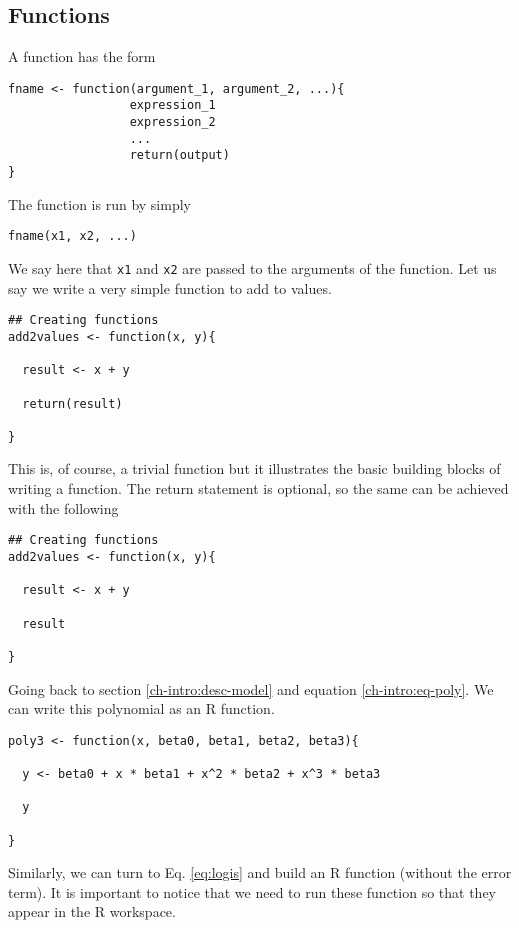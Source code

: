 \subsection{Functions}

A function has the form 

\begin{lstlisting}
fname <- function(argument_1, argument_2, ...){
                 expression_1
                 expression_2
                 ...
                 return(output)
}
\end{lstlisting}

The function is run by simply

\begin{lstlisting}
fname(x1, x2, ...)
\end{lstlisting}

We say here that \texttt{x1} and \texttt{x2} are passed to the
arguments of the function. Let us say we write a very simple function
to add to values.

\begin{lstlisting}
## Creating functions
add2values <- function(x, y){

  result <- x + y

  return(result)

}
\end{lstlisting}

This is, of course, a trivial function but it illustrates the basic
building blocks of writing a function. The return statement is
optional, so the same can be achieved with the following

\begin{lstlisting}
## Creating functions
add2values <- function(x, y){

  result <- x + y

  result

}
\end{lstlisting}

Going back to section \ref{ch-intro:desc-model} and equation
\ref{ch-intro:eq-poly}. We can write this polynomial as an R function.

\begin{lstlisting}
poly3 <- function(x, beta0, beta1, beta2, beta3){

  y <- beta0 + x * beta1 + x^2 * beta2 + x^3 * beta3

  y

}
\end{lstlisting}

Similarly, we can turn to Eq. \ref{eq:logis} and build an R function (without
the error term). It is important to notice that we need to run these
function so that they appear in the R workspace.

